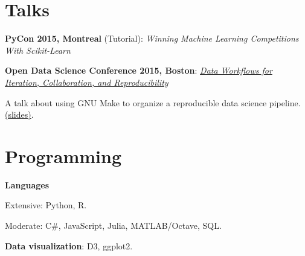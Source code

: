 \documentclass[letterpaper]{resume}
\begin{document}
\section{Talks}

\begin{compactitem}
\item \textbf{PyCon 2015, Montreal} (Tutorial): \textit{Winning Machine Learning Competitions With Scikit-Learn}
\item \textbf{Open Data Science Conference 2015, Boston}: \textit{\href{http://opendatascicon.com/schedule/data-workflows-for-iteration-collaboration-and-reproducibility/}{Data Workflows for Iteration, Collaboration, and Reproducibility}}
\begin{compactitem}
\item A talk about using GNU Make to organize a reproducible data science pipeline. \href{http://www.davidchudzicki.com/slides/odsc-2015-workflow/}{(slides)}.
\end{compactitem}
\end{compactitem}




\section{Programming}
\vspace{1pt}
\begin{compactitem}
\item \textbf{Languages} 
\begin{compactitem}
\item Extensive: Python, R.
\item Moderate: C\#, JavaScript, Julia, MATLAB/Octave, SQL.
\end{compactitem}
\item \textbf{Data visualization}: D3, ggplot2.
\end{compactitem}
\end{document}

